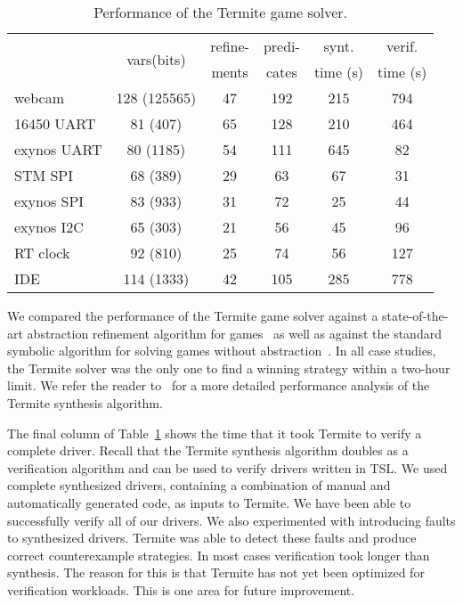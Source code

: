 \documentclass[a4paper,twoside,openright,11pt]{book}
\newcommand{\termite}{Termite\xspace}
\newcommand{\tsl}{TSL\xspace}
\theoremstyle{definition}
\begin{document}
\begin{table}
    \center
    \begin{tabular}{|l|ccccc|}
        \hline
                       & \multirow{2}{*}{vars(bits)} & refine- & predi- & synt.     & verif.   \\
                       &                             & ments   & cates  & time (s)  & time (s) \\
        \hline
        \hline
        webcam         & 128 (125565)                & 47      & 192    & 215       & 794 \\
        16450 UART     & 81  (407)                   & 65      & 128    & 210       & 464 \\
        exynos UART    & 80  (1185)                  & 54      & 111    & 645       & 82 \\
        STM SPI        & 68  (389)                   & 29      & 63     & 67        & 31 \\
        exynos SPI     & 83  (933)                   & 31      & 72     & 25        & 44 \\
        exynos I2C     & 65  (303)                   & 21      & 56     & 45        & 96 \\
        RT clock       & 92  (810)                   & 25      & 74     & 56        & 127 \\
        IDE            & 114 (1333)                  & 42      & 105    & 285       & 778 \\
        \hline
    \end{tabular}
    \caption{Performance of the \termite game solver.}
    \label{t:perf}
\end{table}

We compared the performance of the \termite game solver against a state-of-the-art abstraction refinement algorithm for games~\cite{Alfaro_Roy_07} as well as against the standard symbolic algorithm for solving games without abstraction~\cite{Piterman_PS_06}.  In all case studies, the \termite solver was the only one to find a winning strategy within a two-hour limit.  We refer the reader to~\cite{Walker_Ryzhyk_14} for a more detailed performance analysis of the \termite synthesis algorithm.

The final column of Table~\ref{t:perf} shows the time that it took \termite to verify a complete driver.  Recall that the \termite synthesis algorithm doubles as a verification algorithm and can be used to verify drivers written in \tsl.  We used complete synthesized drivers, containing a combination of manual and automatically generated code, as inputs to \termite.  We have been able to successfully verify all of our drivers.  We also experimented with introducing faults to synthesized drivers.  \termite was able to detect these faults and produce correct counterexample strategies.  In most cases verification took longer than synthesis.  The reason for this is that \termite has not yet been optimized for verification workloads.  This is one area for future improvement.
\end{document}
